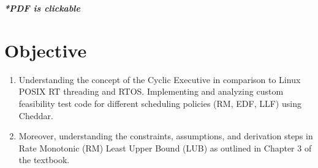 \documentclass[a4paper,11pt]{article}%
\begin{document}



\pagebreak

\tableofcontents
\listoffigures
\listoftables
\vfill
\begin{center}
	\textbf{\textit{*PDF is clickable}}
\end{center}

\pagebreak

\section*{Objective}
\begin{enumerate}
	\item Understanding the concept of the Cyclic Executive in comparison to Linux POSIX RT threading and RTOS.
	      Implementing and analyzing custom feasibility test code for different scheduling policies (RM, EDF, LLF) using Cheddar.
	\item Moreover, understanding the constraints, assumptions, and derivation steps in Rate Monotonic (RM) Least Upper Bound (LUB) as outlined in Chapter 3 of the textbook.

\end{enumerate}
\end{document}
